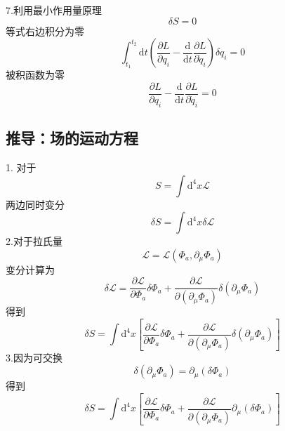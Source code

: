 7.利用最小作用量原理
\begin{equation}
    \delta S=0
\end{equation}
等式右边积分为零
\begin{equation}
    \int_{t_1}^{t_2}{\mathrm{d}t}\left( \frac{\partial L}{\partial q_i}-\frac{\mathrm{d}}{\mathrm{d}t}\frac{\partial L}{\partial \dot{q}_i} \right) \delta q_i=0
\end{equation}
被积函数为零
\begin{equation}
    \frac{\partial L}{\partial q_i}-\frac{\mathrm{d}}{\mathrm{d}t}\frac{\partial L}{\partial \dot{q}_i}=0
\end{equation}

\newpage
\subsection{推导：场的运动方程}
1.
对于
\begin{equation}
    S=\int{\mathrm{d}^4x}\mathcal{L} 
\end{equation}
两边同时变分
\begin{equation}
    \delta S=\int{\mathrm{d}^4x}\delta \mathcal{L} 
\end{equation}
2.对于拉氏量
\begin{equation}
    \mathcal{L} =\mathcal{L} (\Phi _a,\partial _{\mu}\Phi _a)
\end{equation}
变分计算为
\begin{equation}
    \delta \mathcal{L} =\frac{\partial \mathcal{L}}{\partial \Phi _a}\delta \Phi _a+\frac{\partial \mathcal{L}}{\partial \left( \partial _{\mu}\Phi _a \right)}\delta \left( \partial _{\mu}\Phi _a \right) 
\end{equation}
得到
\begin{equation}
    \delta S=\int{\mathrm{d}^4x\left[ \frac{\partial \mathcal{L}}{\partial \Phi _a}\delta \Phi _a+\frac{\partial \mathcal{L}}{\partial \left( \partial _{\mu}\Phi _a \right)}\delta \left( \partial _{\mu}\Phi _a \right) \right]}
\end{equation}
3.因为可交换
\begin{equation}
    \delta \left( \partial _{\mu}\Phi _a \right) =\partial _{\mu}\left( \delta \Phi _a \right) 
\end{equation}
得到
\begin{equation}
    \delta S=\int{\mathrm{d}^4x}\left[ \frac{\partial \mathcal{L}}{\partial \Phi _a}\delta \Phi _a+\frac{\partial \mathcal{L}}{\partial \left( \partial _{\mu}\Phi _a \right)}\partial _{\mu}\left( \delta \Phi _a \right) \right] 
\end{equation}
